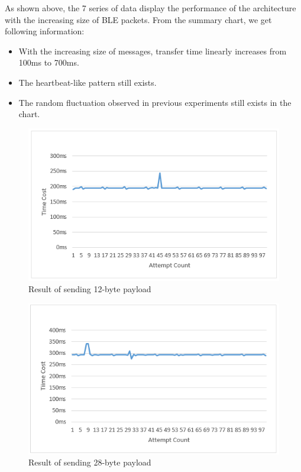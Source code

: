 \documentclass{Nan_Thesis}
\begin{document}
As shown above, the 7 series of data display the performance of the architecture with the increasing size of BLE packets. From the summary chart, we get following information:

\begin{itemize}
  \item With the increasing size of messages, transfer time linearly increases from 100ms to 700ms.
  \item The heartbeat-like pattern still exists.
  \item The random fluctuation observed in previous experiments still exists in the chart.
\end{itemize}

\begin{figure}[H]
  \centering 
      \includegraphics[scale=1]{pic/experiment2result1.png} 
  \caption{Result of sending 12-byte payload}
\end{figure}

\begin{figure}[H]
  \centering 
      \includegraphics[scale=1]{pic/experiment2result2.png} 
  \caption{Result of sending 28-byte payload}
\end{figure}
\end{document}
